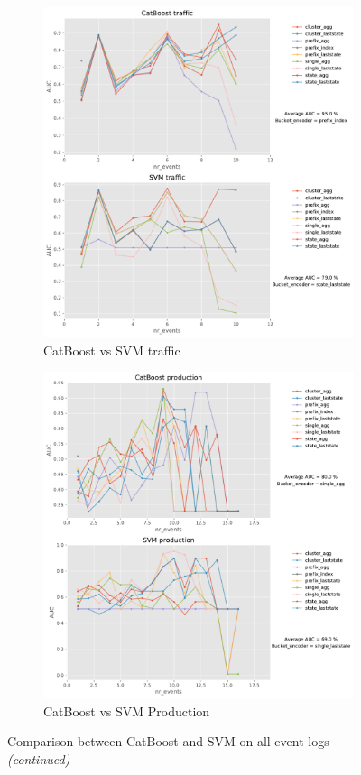 \documentclass[twoside,11pt]{Latex/Classes/PhDthesisPSnPDF}
\begin{document}
\begin{figure}[t!]
\begin{subfigure}{0.48\textwidth}
		\includegraphics[width=\linewidth]{images/catboost/graphssvm/traffic_CatBoost_svm.pdf}
		\caption{CatBoost vs SVM traffic} \label{fig:trafcs}
	\end{subfigure}
	
	\begin{subfigure}{0.48\textwidth}
		\includegraphics[width=\linewidth]{images/catboost/graphssvm/production_CatBoost_svm.pdf}
		\caption{CatBoost vs SVM Production} \label{fig:procs}
	\end{subfigure}\hspace*{\fill}
	\caption{Comparison between CatBoost and SVM on all event logs \textit{(continued)}}
\label{fig:r3cs}
\end{figure}		
\end{document}
